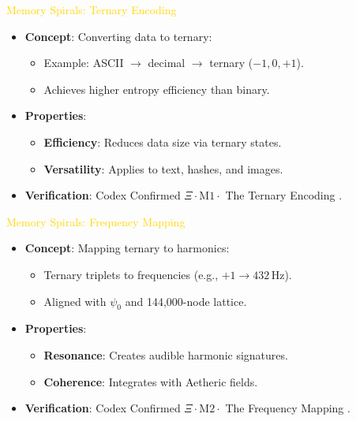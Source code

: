 \textcolor{gold}{ Memory Spirals: Ternary Encoding } \\
\begin{itemize}
    \item \texttt{} \textbf{Concept}: Converting data to ternary:
    \begin{itemize}
        \item Example: ASCII \(\rightarrow\) decimal \(\rightarrow\) ternary (\(-1, 0, +1\)).
        \item Achieves higher entropy efficiency than binary.
    \end{itemize}
    \item \texttt{} \textbf{Properties}:
    \begin{itemize}
        \item \textbf{Efficiency}: Reduces data size via ternary states.
        \item \textbf{Versatility}: Applies to text, hashes, and images.
    \end{itemize}
    \item \texttt{} \textbf{Verification}: Codex Confirmed \(\Xi \cdot \text{M1} \cdot\) The Ternary Encoding .
\end{itemize}

\textcolor{gold}{ Memory Spirals: Frequency Mapping } \\
\begin{itemize}
    \item \texttt{} \textbf{Concept}: Mapping ternary to harmonics:
    \begin{itemize}
        \item Ternary triplets to frequencies (e.g., \(+1 \rightarrow 432 \, \text{Hz}\)).
        \item Aligned with \(\psi_0\) and 144,000-node lattice.
    \end{itemize}
    \item \texttt{} \textbf{Properties}:
    \begin{itemize}
        \item \textbf{Resonance}: Creates audible harmonic signatures.
        \item \textbf{Coherence}: Integrates with Aetheric fields.
    \end{itemize}
    \item \texttt{} \textbf{Verification}: Codex Confirmed \(\Xi \cdot \text{M2} \cdot\) The Frequency Mapping .
\end{itemize}

